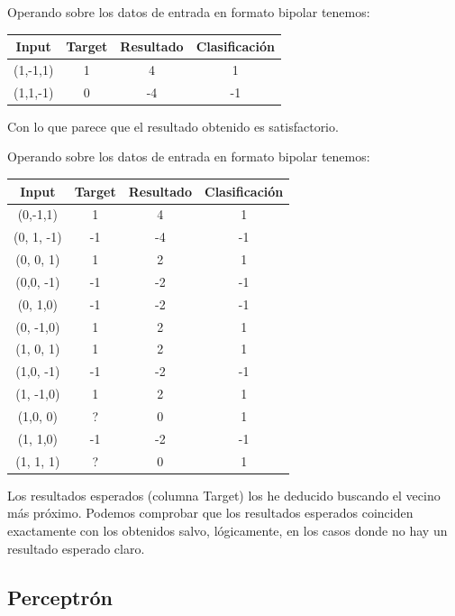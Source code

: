 \begin{problem}[6]
\spart
Operando sobre los datos de entrada en formato bipolar tenemos:
\begin{center}
\begin{tabular}{|c|c|c|c|}
\hline
\textbf{Input} & \textbf{Target} & \textbf{Resultado} & \textbf{Clasificación}\\
\hline
(1,-1,1) & 1 &  4 & 1\\
(1,1,-1) & 0 & -4 & -1\\
\hline
\end{tabular}
\end{center}
Con lo que parece que el resultado obtenido es satisfactorio.

\spart
Operando sobre los datos de entrada en formato bipolar tenemos:
\begin{center}
\begin{tabular}{|c|c|c|c|}
\hline
\textbf{Input} & \textbf{Target} & \textbf{Resultado} & \textbf{Clasificación}\\
\hline
(0,-1,1)   &  1 & 4  & 1\\
(0, 1, -1) & -1 & -4  & -1\\
(0, 0, 1)  &  1 & 2  & 1\\
(0,0, -1)  & -1 & -2 & -1\\
(0, 1,0)   & -1 & -2 & -1\\
(0, -1,0)  &  1 & 2 & 1\\
(1, 0, 1)  &  1 & 2 & 1\\
(1,0, -1)  & -1 & -2 & -1\\
(1, -1,0)  &  1 & 2 & 1\\
(1,0, 0)   &  ? & 0  & 1\\
(1, 1,0)   & -1 & -2 & -1\\
(1, 1, 1)  &  ? & 0 & 1\\
\hline
\end{tabular}
\end{center}

Los resultados esperados (columna Target) los he deducido buscando el vecino más próximo. Podemos comprobar que los resultados esperados coinciden exactamente con los obtenidos salvo, lógicamente, en los casos donde no hay un resultado esperado claro.

\end{problem}

\subsection{Perceptrón}

